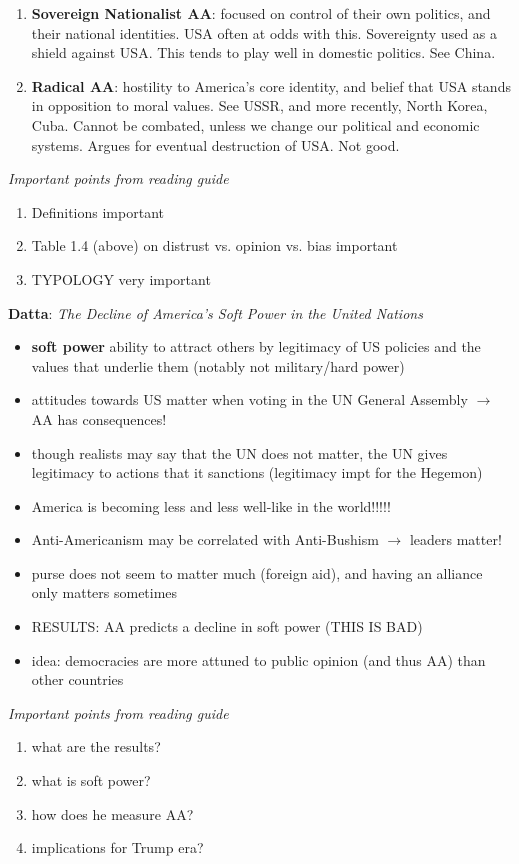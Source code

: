 \documentclass{article}
\begin{document}
\begin{itemize}
\begin{enumerate}
        \item \textbf{Sovereign Nationalist AA}: focused on control of their own politics, and their national identities. USA often at odds with this. Sovereignty used as a shield against USA. This tends to play well in domestic politics. See China. 
        \item \textbf{Radical AA}: hostility to America's core identity, and belief that USA stands in opposition to moral values. See USSR, and more recently, North Korea, Cuba. Cannot be combated, unless we change our political and economic systems. Argues for eventual destruction of USA. Not good.
    \end{enumerate}
\end{itemize}
\textit{Important points from reading guide}
\begin{enumerate}
    \item Definitions important
    \item Table 1.4 (above) on distrust vs. opinion vs. bias important
    \item TYPOLOGY very important
\end{enumerate}
\bigskip
\textbf{Datta}: \textit{The Decline of America's Soft Power in the United Nations}
\begin{itemize}
    \item \textbf{soft power} ability to attract others by legitimacy of US policies and the values that underlie them (notably not military/hard power)
    \item attitudes towards US matter when voting in the UN General Assembly $\rightarrow$ AA has consequences!
    \item though realists may say that the UN does not matter, the UN gives legitimacy to actions that it sanctions (legitimacy impt for the Hegemon)
    \item America is becoming less and less well-like in the world!!!!!
    \item Anti-Americanism may be correlated with Anti-Bushism $\rightarrow$ leaders matter!
    \item purse does not seem to matter much (foreign aid), and having an alliance only matters sometimes
    \item RESULTS: AA predicts a decline in soft power (THIS IS BAD)
    \item idea: democracies are more attuned to public opinion (and thus AA) than other countries
\end{itemize}
\textit{Important points from reading guide}
\begin{enumerate}
    \item what are the results?
    \item what is soft power?
    \item how does he measure AA?
    \item implications for Trump era?
\end{enumerate}
\end{document}
